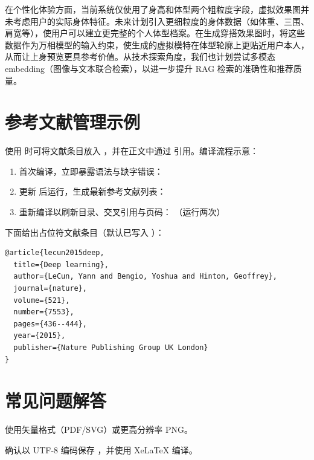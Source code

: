 \documentclass{applemlr}
\begin{document}
在个性化体验方面，当前系统仅使用了身高和体型两个粗粒度字段，虚拟效果图并未考虑用户的实际身体特征。未来计划引入更细粒度的身体数据（如体重、三围、肩宽等），使用户可以建立更完整的个人体型档案。在生成穿搭效果图时，将这些数据作为万相模型的输入约束，使生成的虚拟模特在体型轮廓上更贴近用户本人，从而让上身预览更具参考价值。从技术探索角度，我们也计划尝试多模态 embedding（图像与文本联合检索），以进一步提升 RAG 检索的准确性和推荐质量。




\appendix

\section{参考文献管理示例}
\label{sec:bib}

使用  时可将文献条目放入 ，并在正文中通过  引用。编译流程示意：
\begin{enumerate}
  \item 首次编译，立即暴露语法与缺字错误：
  \item 更新  后运行，生成最新参考文献列表：
  \item 重新编译以刷新目录、交叉引用与页码： （运行两次）
\end{enumerate}



下面给出占位符文献条目（默认已写入 ）：
\begin{verbatim}
@article{lecun2015deep,
  title={Deep learning},
  author={LeCun, Yann and Bengio, Yoshua and Hinton, Geoffrey},
  journal={nature},
  volume={521},
  number={7553},
  pages={436--444},
  year={2015},
  publisher={Nature Publishing Group UK London}
}
\end{verbatim}

\section{常见问题解答}

\begin{description}[leftmargin=0.5cm,labelindent=0cm]
  \item[图像模糊] 使用矢量格式（PDF/SVG）或更高分辨率 PNG。
  \item[中文乱码] 确认以 UTF-8 编码保存 ，并使用 XeLaTeX 编译。
\end{description}
\end{document}
